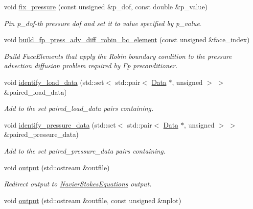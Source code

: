 \begin{DoxyCompactItemize}
void \hyperlink{classoomph_1_1QTaylorHoodElement_ab47f75f2720d9f42d1f073d9bf5f5077}{fix\+\_\+pressure} (const unsigned \&p\+\_\+dof, const double \&p\+\_\+value)
\begin{DoxyCompactList}\small\item\em Pin p\+\_\+dof-\/th pressure dof and set it to value specified by p\+\_\+value. \end{DoxyCompactList}\item 
void \hyperlink{classoomph_1_1QTaylorHoodElement_aa3c4eabbedadb47c3bcbbbe22febf3cf}{build\+\_\+fp\+\_\+press\+\_\+adv\+\_\+diff\+\_\+robin\+\_\+bc\+\_\+element} (const unsigned \&face\+\_\+index)
\begin{DoxyCompactList}\small\item\em Build Face\+Elements that apply the Robin boundary condition to the pressure advection diffusion problem required by Fp preconditioner. \end{DoxyCompactList}\item 
void \hyperlink{classoomph_1_1QTaylorHoodElement_af14ad75ea276ed120e620646f48dcc0c}{identify\+\_\+load\+\_\+data} (std\+::set$<$ std\+::pair$<$ \hyperlink{classoomph_1_1Data}{Data} $\ast$, unsigned $>$ $>$ \&paired\+\_\+load\+\_\+data)
\begin{DoxyCompactList}\small\item\em Add to the set {\ttfamily paired\+\_\+load\+\_\+data} pairs containing. \end{DoxyCompactList}\item 
void \hyperlink{classoomph_1_1QTaylorHoodElement_ad1488e770c1364c5d6f25ce30532d9d4}{identify\+\_\+pressure\+\_\+data} (std\+::set$<$ std\+::pair$<$ \hyperlink{classoomph_1_1Data}{Data} $\ast$, unsigned $>$ $>$ \&paired\+\_\+pressure\+\_\+data)
\begin{DoxyCompactList}\small\item\em Add to the set {\ttfamily paired\+\_\+pressure\+\_\+data} pairs containing. \end{DoxyCompactList}\item 
void \hyperlink{classoomph_1_1QTaylorHoodElement_a66200b671d6b16402d0d89c382af2f95}{output} (std\+::ostream \&outfile)
\begin{DoxyCompactList}\small\item\em Redirect output to \hyperlink{classoomph_1_1NavierStokesEquations}{Navier\+Stokes\+Equations} output. \end{DoxyCompactList}\item 
void \hyperlink{classoomph_1_1QTaylorHoodElement_a9a19616b9abaf15ad273f9eaa951de73}{output} (std\+::ostream \&outfile, const unsigned \&nplot)

\end{DoxyCompactItemize}
